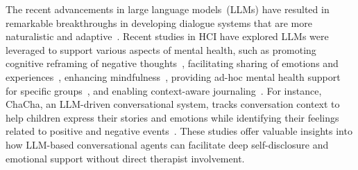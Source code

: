 
The recent advancements in large language models~(LLMs) have resulted in remarkable breakthroughs in developing dialogue systems that are more naturalistic and adaptive~\cite{bae2022building,hamalainen2023evaluating}. 
Recent studies in HCI have explored LLMs were leveraged to support various aspects of mental health, such as promoting cognitive reframing of negative thoughts~\cite{sharma2024facilitating, sharma2023cognitive}, facilitating sharing of emotions and experiences~\cite{seo2024chacha}, enhancing mindfulness~\cite{kumar2023exploring}, providing ad-hoc mental health support for specific groups~\cite{ma2024evaluating}, and enabling context-aware journaling~\cite{nepal2024contextual,10.1145/3699761}.
For instance, ChaCha, an LLM-driven conversational system, tracks conversation context to help children express their stories and emotions while identifying their feelings related to positive and negative events~\cite{seo2024chacha}. These studies offer valuable insights into how LLM-based conversational agents can facilitate deep self-disclosure and emotional support without direct therapist involvement.

